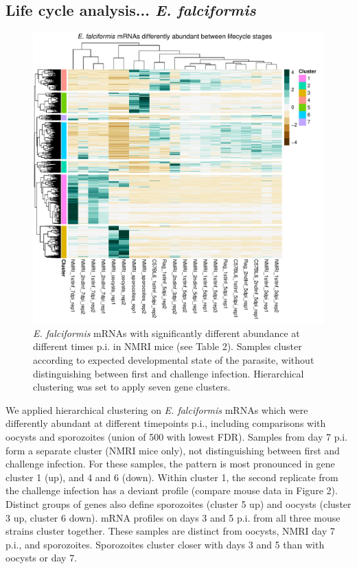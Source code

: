 \documentclass{bmcart}
\begin{document}
\subsection{Life cycle analysis... \textit{E. falciformis}}
\begin{figure}[h!]
	\includegraphics[width=\linewidth]{EfLifecycleHeatmap.pdf}  
	\caption{\textit{E. falciformis} mRNAs with significantly different abundance at different times p.i. in NMRI mice (see Table 2). Samples cluster according to expected developmental state of the parasite, without distinguishing between first and challenge infection. Hierarchical clustering was set to apply seven gene clusters.}
\end{figure}

We applied hierarchical clustering on \textit{E. falciformis} mRNAs which were differently abundant at different timepoints p.i., including comparisons with oocysts and sporozoites (union of 500 with lowest FDR). Samples from day 7 p.i. form a separate cluster (NMRI mice only), not distinguishing between first and challenge infection. For these samples, the pattern is most pronounced in gene cluster 1 (up), and 4 and 6 (down). Within cluster 1, the second replicate from the challenge infection has a deviant profile (compare mouse data in Figure 2). Distinct groups of genes also define sporozoites (cluster 5 up) and oocysts (cluster 3 up, cluster 6 down). mRNA profiles on days 3 and 5 p.i. from all three mouse strains cluster together. These samples are distinct from oocysts, NMRI day 7 p.i., and sporozoites. Sporozoites cluster closer with days 3 and 5 than with oocysts or day 7.
\end{document}
